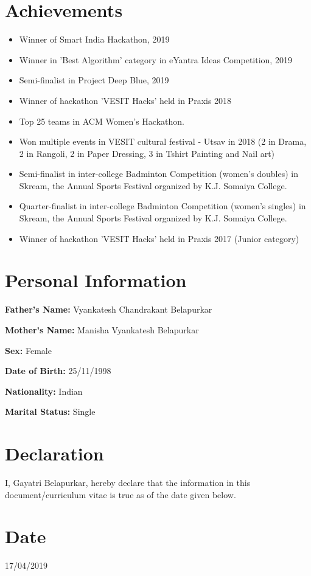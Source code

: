 \documentclass[margin]{res}
\begin{document}
\begin{resume}
\section{Achievements}
\begin{itemize}
\item Winner of Smart India Hackathon, 2019
\item Winner in 'Best Algorithm' category in eYantra Ideas Competition, 2019
\item Semi-finalist in Project Deep Blue, 2019
\item Winner of hackathon 'VESIT Hacks' held in Praxis 2018
\item Top 25 teams in ACM Women's Hackathon. 
\item Won multiple events in VESIT cultural festival - Utsav in 2018 (2 in Drama, 2 in Rangoli, 2 in Paper Dressing, 3 in Tshirt Painting and Nail art)
\item Semi-finalist in inter-college Badminton Competition (women's doubles) in Skream, the Annual Sports Festival organized by K.J. Somaiya College.
\item Quarter-finalist in inter-college Badminton Competition (women's singles) in Skream, the Annual Sports Festival organized by K.J. Somaiya College.
\item Winner of hackathon 'VESIT Hacks' held in Praxis 2017 (Junior category)
\end{itemize}

\section{Personal Information}
{\bf Father's Name:} Vyankatesh Chandrakant Belapurkar

{\bf Mother's Name:} Manisha Vyankatesh Belapurkar

{\bf Sex:} Female

{\bf Date of Birth:} 25/11/1998

{\bf Nationality:} Indian

{\bf Marital Status:} Single

\section{Declaration}
I, Gayatri Belapurkar, hereby declare that the information in this document/curriculum vitae is true as of the date given below. 

\section{Date}
17/04/2019

\end{resume}
\end{document}
